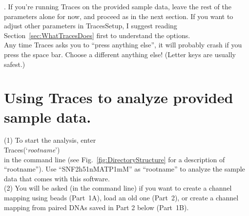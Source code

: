 \documentclass[11pt]{article}
\newcommand{\sj}[1]{\textcolor{red}{#1}}
\begin{document}
. If you're running Traces on the provided sample data, leave the rest of the parameters alone for now, and proceed as in the next section. If you want to adjust other parameters in TracesSetup, I suggest reading Section~\ref{sec:WhatTracesDoes} first to understand the options.\\

 Any time Traces asks you to ``press anything else'', it will probably crash if you press the space bar. Choose a different anything else! (Letter keys are usually safest.)

\clearpage

\section{Using Traces to analyze provided sample data.}\label{sec:RunningTraces}

(1) To start the analysis, enter\\

\noindent Traces(`{\it rootname}')\\

\noindent in the command line (see Fig.~\ref{fig:DirectoryStructure} for a description of ``rootname'').  Use ``SNF2h51nMATP1mM'' as ``rootname'' to analyze the sample data that comes with this software.  \\



\noindent (2) You will be asked (in the command line) if you want to create a channel mapping using beads (Part~1A), load an old one (Part~2), or create a channel mapping from paired DNAs saved in Part 2 below (Part~1B). 
\end{document}
